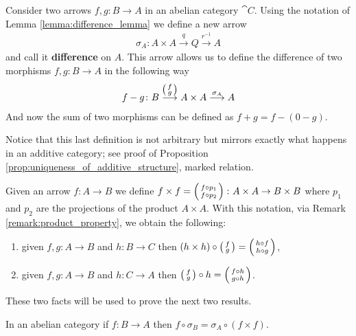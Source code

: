 \begin{definition}
  \label{def:difference_on_abelian_categories}
  Consider two arrows \(f,g\colon B\to A\) in an abelian category \(\cat{C}\). Using the notation of Lemma \ref{lemma:difference_lemma} we define a new arrow
  \begin{align*}
    \sigma_A\colon A\times A\overset{q}{\longrightarrow}Q\overset{r^{-1}}{\longrightarrow}A
  \end{align*}
  and call it {\bf difference} on \(A\). This arrow allows us to define the difference of two morphisms \(f,g\colon B\to A\) in the following way
  \begin{align*}
    f-g\colon B\overset{\left(\begin{smallmatrix}f\\ g\end{smallmatrix}\right)}{\longrightarrow} A\times A\overset{\sigma_A}{\longrightarrow} A
  \end{align*}
  And now the sum of two morphisms can be defined as \(f + g = f - (0 - g)\).
\end{definition}

\begin{remark}
  \label{rem:additive_structure}
  Notice that this last definition is not arbitrary but mirrors exactly what happens in an additive category; see proof of Proposition \ref{prop:uniqueness_of_additive_structure}, marked relation.
\end{remark}

\begin{remark}
  \label{remark:product_of_morphisms}
  Given an arrow \(f\colon A\to B\) we define \(f\times f = \left(\begin{smallmatrix}f\circ p_1\\ f\circ p_2\end{smallmatrix}\right)\colon A\times A\to B\times B\) where \(p_1\) and \(p_2\) are the projections of the product \(A\times A\). With this notation, via Remark \ref{remark:product_property}, we obtain the following:
  \begin{enumerate}[label=(\arabic*)]
  \item given \(f,g\colon A\to B\) and \(h\colon B\to C\) then \((h\times h)\circ\left(\begin{smallmatrix}f\\ g\end{smallmatrix}\right) = \left(\begin{smallmatrix}h\circ f\\ h\circ g\end{smallmatrix}\right)\),
  \item given \(f,g\colon A\to B\) and \(h\colon C\to A\) then \(\left(\begin{smallmatrix}f\\ g\end{smallmatrix}\right)\circ h = \left(\begin{smallmatrix}f\circ h\\ g\circ h\end{smallmatrix}\right)\).
  \end{enumerate}
  These two facts will be used to prove the next two results.
\end{remark}

\begin{lemma}
  \label{lemma:sigma_lemma}
  In an abelian category if \(f\colon B\to A\) then \(f\circ\sigma_B = \sigma_A\circ(f\times f)\).
\end{lemma}


